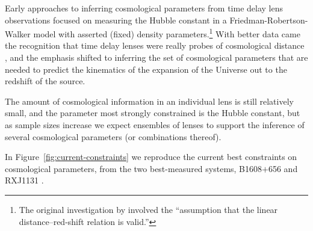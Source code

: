 


Early approaches to inferring cosmological parameters from time delay
lens observations focused on measuring the Hubble constant in a
Friedman-Robertson-Walker model with asserted (fixed) density
parameters.\footnote{The original investigation by \citet{Ref64}
involved the ``assumption that the linear distance--red-shift relation
is valid.''} With better data came the recognition that time delay
lenses were really probes of cosmological distance
\citep{Koo++03,Suy++10}, and the emphasis shifted to
inferring the set of cosmological parameters that are needed  to predict
the kinematics of the expansion of the Universe out to the redshift of
the source.

The amount of cosmological information in an individual lens
is still relatively small, and the parameter most strongly constrained
is  the Hubble constant, but as sample sizes increase we expect
ensembles of  lenses to support the inference of several cosmological
parameters (or combinations thereof).

In Figure~\ref{fig:current-constraints} we reproduce the current
best constraints on  cosmological parameters, from the two best-measured
systems, B1608$+$656 and RXJ1131 \citep{Suy++14}.

